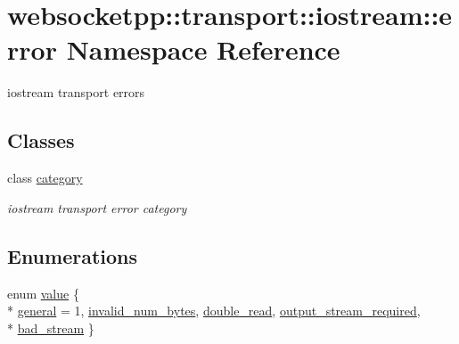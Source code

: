 \hypertarget{namespacewebsocketpp_1_1transport_1_1iostream_1_1error}{}\section{websocketpp\+:\+:transport\+:\+:iostream\+:\+:error Namespace Reference}
\label{namespacewebsocketpp_1_1transport_1_1iostream_1_1error}


iostream transport errors  


\subsection*{Classes}
\begin{DoxyCompactItemize}
\item 
class \hyperlink{classwebsocketpp_1_1transport_1_1iostream_1_1error_1_1category}{category}
\begin{DoxyCompactList}\small\item\em iostream transport error category \end{DoxyCompactList}\end{DoxyCompactItemize}
\subsection*{Enumerations}
\begin{DoxyCompactItemize}
\item 
enum \hyperlink{namespacewebsocketpp_1_1transport_1_1iostream_1_1error_a647b428e260748d7606c92255e1e9737}{value} \{ \\*
\hyperlink{namespacewebsocketpp_1_1transport_1_1iostream_1_1error_a647b428e260748d7606c92255e1e9737a509b29b678dabf2fa2776636b3ba3c98}{general} = 1, 
\hyperlink{namespacewebsocketpp_1_1transport_1_1iostream_1_1error_a647b428e260748d7606c92255e1e9737aa185b313b5353e821c3fce4bf62f50a6}{invalid\+\_\+num\+\_\+bytes}, 
\hyperlink{namespacewebsocketpp_1_1transport_1_1iostream_1_1error_a647b428e260748d7606c92255e1e9737ac1ae213118c53b4d7eceb10876d88266}{double\+\_\+read}, 
\hyperlink{namespacewebsocketpp_1_1transport_1_1iostream_1_1error_a647b428e260748d7606c92255e1e9737a92341254bd27c7cb97fb5e1aca5310f3}{output\+\_\+stream\+\_\+required}, 
\\*
\hyperlink{namespacewebsocketpp_1_1transport_1_1iostream_1_1error_a647b428e260748d7606c92255e1e9737ad46c640654d1d96c517444d95d24da45}{bad\+\_\+stream}
 \}
\end{DoxyCompactItemize}
